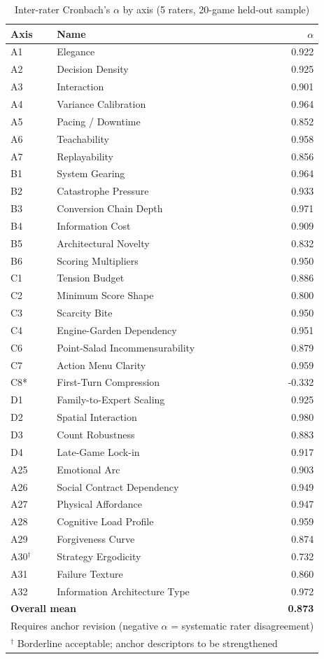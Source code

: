 \begin{table}[ht]
\centering
\caption{Inter-rater Cronbach's $\alpha$ by axis (5 raters, 20-game held-out sample)}
\label{tab:icc}
\begin{tabular}{llr}
\toprule
\textbf{Axis} & \textbf{Name} & \textbf{$\alpha$} \\
\midrule
A1 & Elegance & 0.922 \\
A2 & Decision Density & 0.925 \\
A3 & Interaction & 0.901 \\
A4 & Variance Calibration & 0.964 \\
A5 & Pacing / Downtime & 0.852 \\
A6 & Teachability & 0.958 \\
A7 & Replayability & 0.856 \\
\midrule
B1 & System Gearing & 0.964 \\
B2 & Catastrophe Pressure & 0.933 \\
B3 & Conversion Chain Depth & 0.971 \\
B4 & Information Cost & 0.909 \\
B5 & Architectural Novelty & 0.832 \\
B6 & Scoring Multipliers & 0.950 \\
\midrule
C1 & Tension Budget & 0.886 \\
C2 & Minimum Score Shape & 0.800 \\
C3 & Scarcity Bite & 0.950 \\
C4 & Engine-Garden Dependency & 0.951 \\
C6 & Point-Salad Incommensurability & 0.879 \\
C7 & Action Menu Clarity & 0.959 \\
C8* & First-Turn Compression & -0.332 \\
\midrule
D1 & Family-to-Expert Scaling & 0.925 \\
D2 & Spatial Interaction & 0.980 \\
D3 & Count Robustness & 0.883 \\
D4 & Late-Game Lock-in & 0.917 \\
\midrule
A25 & Emotional Arc & 0.903 \\
A26 & Social Contract Dependency & 0.949 \\
A27 & Physical Affordance & 0.947 \\
A28 & Cognitive Load Profile & 0.959 \\
A29 & Forgiveness Curve & 0.874 \\
A30$^\dagger$ & Strategy Ergodicity & 0.732 \\
A31 & Failure Texture & 0.860 \\
A32 & Information Architecture Type & 0.972 \\
\midrule
\multicolumn{2}{l}{\textbf{Overall mean}} & \textbf{0.873} \\
\bottomrule
\multicolumn{3}{l}{\footnotesize * Requires anchor revision (negative $\alpha$ = systematic rater disagreement)} \\
\multicolumn{3}{l}{\footnotesize $^\dagger$ Borderline acceptable; anchor descriptors to be strengthened} \\
\end{tabular}
\end{table}

